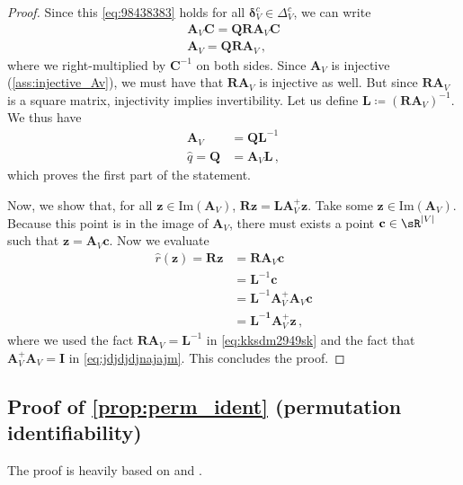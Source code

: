 \documentclass{article}
\newcommand{\z}{\mathbf{z}}
\newcommand{\A}{\mathbf{A}}
\renewcommand{\c}{\mathbf{c}}
\newcommand{\deltaBold}{\boldsymbol{\delta}}
\newcommand{\deltac}{\deltaBold^c}
\begin{document}
\begin{proof}
    Since this \cref{eq:98438383} holds for all $\deltac_V \in \Delta^c_V$, we can write
    \begin{align}
        \A_V \mathbf{C} = \mathbf{Q}\mathbf{R}\A_V\mathbf{C}\\
        \A_V = \mathbf{Q}\mathbf{R}\A_V \,,
    \end{align}
    where we right-multiplied by $\mathbf{C}^{-1}$ on both sides. Since $\A_V$ is injective (\cref{ass:injective_Av}), we must have that $\mathbf{R}\A_V$ is injective as well. But since $\mathbf{R}\A_V$ is a square matrix, injectivity implies invertibility. Let us define $\mathbf{L} \coloneqq (\mathbf{R}\A_V)^{-1}$. We thus have
    \begin{align}
        \A_V &= \mathbf{Q}\mathbf{L}^{-1} \\
        \hat q = \mathbf{Q} &= \A_V\mathbf{L} \,,
    \end{align}
    which proves the first part of the statement.

    Now, we show that, for all $\z \in \text{Im}(\A_V)$, $\mathbf{R}\z = \mathbf{L}\A_V^+\z$. Take some $\z \in \text{Im}(\A_V)$. Because this point is in the image of $\A_V$, there must exists a point $\c \in \sR^{|V|}$ such that $\z = \A_V\c$. Now we evaluate
    \begin{align}
        \hat r(\z) = \mathbf{R}\z &= \mathbf{R}\A_V\c  \\
        &= \mathbf{L}^{-1}\c \label{eq:kksdm2949sk}\\ 
        &= \mathbf{L}^{-1}\A_V^+\A_V\c \label{eq:jdjdjdjnajajm}\\
        &= \mathbf{L^{-1}}\A_V^+\z \,, 
    \end{align}
    where we used the fact $\mathbf{R}\A_V = \mathbf{L}^{-1}$ in \cref{eq:kksdm2949sk} and the fact that $\A_V^+\A_V = \mathbf{I}$ in \cref{eq:jdjdjdjnajajm}. This concludes the proof.
\end{proof}


\subsection{Proof of \cref{prop:perm_ident} (permutation identifiability)}
\label{app:proof}
The proof is heavily based on \citet{lachapelle2023synergies} and \citet{xu2024sparsityprinciplepartiallyobservable}.

\permIdent*
\end{document}
